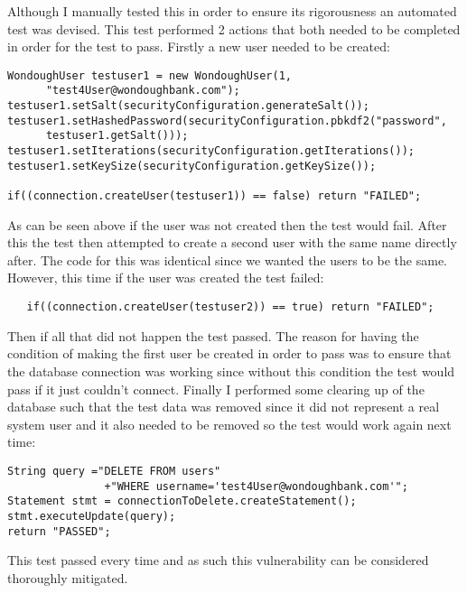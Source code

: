 Although I manually tested this in order to ensure its rigorousness an automated test was devised. This test performed 2 actions that both needed to be completed in order for
the test to pass. Firstly a new user needed to be created:
\begin{verbatim}
WondoughUser testuser1 = new WondoughUser(1,
      "test4User@wondoughbank.com");
testuser1.setSalt(securityConfiguration.generateSalt());
testuser1.setHashedPassword(securityConfiguration.pbkdf2("password",
      testuser1.getSalt()));
testuser1.setIterations(securityConfiguration.getIterations());
testuser1.setKeySize(securityConfiguration.getKeySize());

if((connection.createUser(testuser1)) == false) return "FAILED";
\end{verbatim}
As can be seen above if the user was not created then the test would fail. After this the test then attempted to create a second user with the same name directly after. The code
for this was identical since we wanted the users to be the same. However, this time if the user was created the test failed:
\begin{verbatim}
   if((connection.createUser(testuser2)) == true) return "FAILED";
\end{verbatim}
Then if all that did not happen the test passed. The reason for having the condition of making the first user be created in order to pass was to ensure that the database
connection was working since without this condition the test would pass if it just couldn't connect. Finally I performed some clearing up of the database such that the test data
was removed since it did not represent a real system user and it also needed to be removed so the test would work again next time:
\begin{verbatim}
String query ="DELETE FROM users"
               +"WHERE username='test4User@wondoughbank.com'";
Statement stmt = connectionToDelete.createStatement();
stmt.executeUpdate(query);
return "PASSED";
\end{verbatim}
This test passed every time and as such this vulnerability can be considered thoroughly mitigated.
